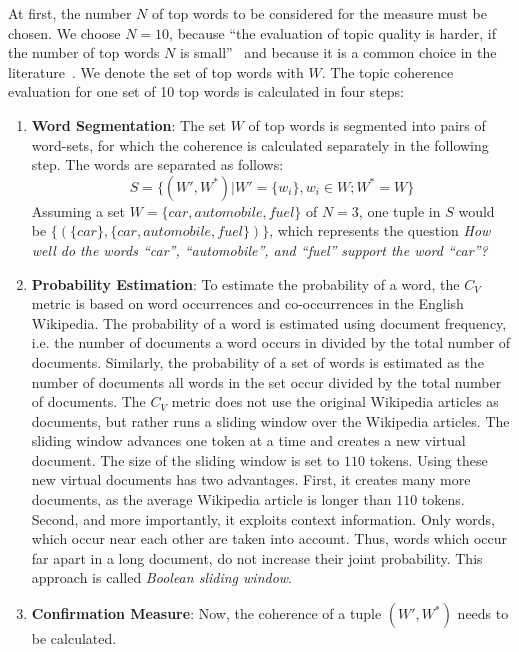 \documentclass[
        a4paper,
        titlepage,
        twoside,
        parskip
        ]{scrbook}
\theoremstyle{break}
\begin{document}
At first, the number $N$ of top words to be considered for the measure must be chosen.
We choose $N=10$, because ``the evaluation of topic quality is harder, if the number of top words $N$ is small''~\cite{Roder2015} and because it is a common choice in the literature~\cite{Roder2015,Aletras2013}.
We denote the set of top words with $W$.
The topic coherence evaluation for one set of 10 top words is calculated in four steps:
\begin{enumerate}
  \item \textbf{Word Segmentation}:
    The set $W$ of top words is segmented into pairs of word-sets, for which the coherence is calculated separately in the following step.
    The words are separated as follows:
    \begin{equation*}
      S = \{ (W', W^*) | W' = \{w_i\}, w_i \in W; W^* = W \}
    \end{equation*}
    Assuming a set $W = \{ car, automobile, fuel \}$ of $N = 3$, one tuple in $S$ would be $\{ (\{car\}, \{car, automobile, fuel\})\}$, which represents the question \emph{How well do the words ``car'', ``automobile'', and ``fuel'' support the word ``car''?}
  \item \textbf{Probability Estimation}:
    To estimate the probability of a word, the $C_V$ metric is based on word occurrences and co-occurrences in the English Wikipedia.
    The probability of a word is estimated using document frequency, i.e. the number of documents a word occurs in divided by the total number of documents.
    Similarly, the probability of a set of words is estimated as the number of documents all words in the set occur divided by the total number of documents.
    The $C_V$ metric does not use the original Wikipedia articles as documents, but rather runs a sliding window over the Wikipedia articles.
    The sliding window advances one token at a time and creates a new virtual document.
    The size of the sliding window is set to $110$ tokens.
    Using these new virtual documents has two advantages.
    First, it creates many more documents, as the average Wikipedia article is longer than $110$ tokens.
    Second, and more importantly, it exploits context information.
    Only words, which occur near each other are taken into account.
    Thus, words which occur far apart in a long document, do not increase their joint probability.
    This approach is called \emph{Boolean sliding window}.
  \item \textbf{Confirmation Measure}:
    Now, the coherence of a tuple $(W', W^*)$ needs to be calculated.

\end{enumerate}
\end{document}

